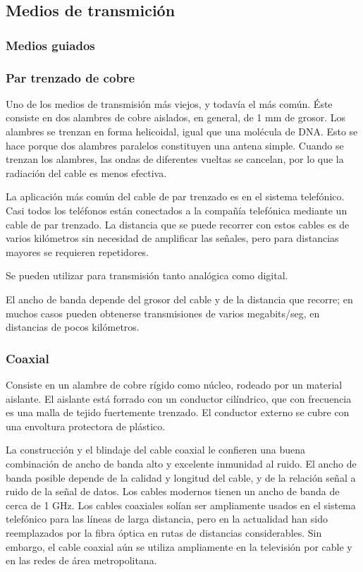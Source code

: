  \subsection{Medios de transmición}
 \subsubsection{Medios guiados}
 \subsubsection*{Par trenzado de cobre} Uno de los medios de transmisión más viejos, y todavía el más común. Éste consiste en dos alambres de cobre aislados, en general, de 1 mm de grosor. Los alambres se trenzan en forma helicoidal, igual que una molécula de DNA. Esto se hace porque dos alambres paralelos constituyen una antena simple. Cuando se trenzan los alambres, las ondas de diferentes vueltas se cancelan, por lo que la radiación del cable es menos efectiva.

La aplicación más común del cable de par trenzado es en el sistema telefónico. Casi todos los teléfonos están conectados a la compañía telefónica mediante un cable de par trenzado. La distancia que se puede recorrer con estos cables es de varios kilómetros sin necesidad de amplificar las señales, pero para distancias mayores se requieren repetidores.
    
Se pueden utilizar para transmisión tanto analógica como digital. 

El ancho de banda depende del grosor del cable y de la distancia que recorre; en muchos casos pueden obtenerse transmisiones de varios megabits/seg, en distancias de pocos kilómetros.

\subsubsection*{Coaxial}
Consiste en un alambre de cobre rígido como núcleo, rodeado por un material aislante. El aislante está forrado con un conductor cilíndrico, que con frecuencia es una malla de tejido fuertemente trenzado. El conductor externo se cubre con una envoltura protectora de plástico.

La construcción y el blindaje del cable coaxial le confieren una buena combinación de ancho de banda alto y excelente inmunidad al ruido. El ancho de banda posible depende de la calidad y longitud del cable, y de la relación señal a ruido de la señal de datos. Los cables modernos tienen un ancho de banda de cerca de 1 GHz. Los cables coaxiales solían ser ampliamente usados en el sistema telefónico para las líneas de larga distancia, pero en la actualidad han sido reemplazados
por la fibra óptica en rutas de distancias considerables. Sin embargo, el cable coaxial aún se utiliza ampliamente en la televisión por cable y en las redes de área metropolitana.


